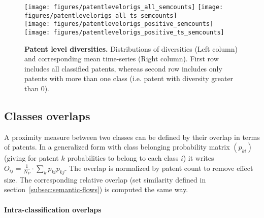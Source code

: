 \documentclass[10pt,A4]{article}
\begin{document}
\begin{figure}

\texttt{[image: figures/patentlevelorigs\_all\_semcounts]}
\texttt{[image: figures/patentlevelorigs\_all\_ts\_semcounts]}\\
\texttt{[image: figures/patentlevelorigs\_positive\_semcounts]}
\texttt{[image: figures/patentlevelorigs\_positive\_ts\_semcounts]}
\caption{
\textbf{Patent level diversities.} Distributions of diversities (Left column) and corresponding mean time-series (Right column). First row includes all classified patents, whereas second row includes only patents with more than one class (i.e. patent with diversity greater than 0). 
}
\label{fig:patent-level-orig}
\end{figure}






\subsection{Classes overlaps}


A proximity measure between two classes can be defined by their overlap in terms of patents. In a generalized form with class belonging probability matrix $\left(p_{ki}\right)$ (giving for patent $k$ probabilities to belong to each class $i$) it writes $O_{ij} = \frac{1}{N_P}\cdot \sum_{k} p_{ki} p_{kj}$. The overlap is normalized by patent count to remove effect size. The corresponding relative overlap (set similarity defined in section~\ref{subsec:semantic-flows}) is computed the same way.


\paragraph{Intra-classification overlaps}
\end{document}
